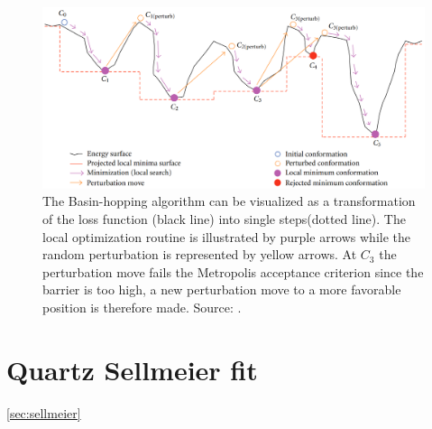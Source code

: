 \begin{figure}
    \centering
    \includegraphics[scale=0.3]{images/7_appendix/bh.png}
    \caption{The Basin-hopping algorithm can be visualized as a transformation of the loss function (black line) into single steps(dotted line). 
    The local optimization routine is illustrated by purple arrows while the random perturbation is represented by yellow arrows. At $C_3$ the perturbation move fails the Metropolis acceptance criterion since the barrier is too high, a new perturbation move to a more favorable position is therefore made. Source: \cite{Olson2012}.}
    \label{fig:Basin-hopping}
\end{figure}

\section{Quartz Sellmeier fit}
\ref{sec:sellmeier}


